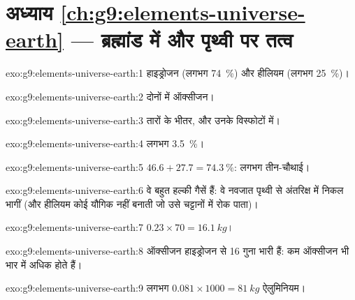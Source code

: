 \section*{अध्याय \ref{ch:g9:elements-universe-earth} --- ब्रह्मांड में और पृथ्वी पर तत्व}

\begin{solution}{exo:g9:elements-universe-earth:1}
हाइड्रोजन (लगभग \qty{74}{\percent}) और हीलियम (लगभग
\qty{25}{\percent})।
\end{solution}

\begin{solution}{exo:g9:elements-universe-earth:2}
दोनों में ऑक्सीजन।
\end{solution}

\begin{solution}{exo:g9:elements-universe-earth:3}
तारों के भीतर, और उनके विस्फोटों में।
\end{solution}

\begin{solution}{exo:g9:elements-universe-earth:4}
लगभग \qty{3.5}{\percent}।
\end{solution}

\begin{solution}{exo:g9:elements-universe-earth:5}
$46.6 + 27.7 = \qty{74.3}{\percent}$: लगभग तीन-चौथाई।
\end{solution}

\begin{solution}{exo:g9:elements-universe-earth:6}
वे बहुत हल्की गैसें हैं: वे नवजात पृथ्वी से अंतरिक्ष में निकल भागीं
(और हीलियम कोई यौगिक नहीं बनाती जो उसे चट्टानों में रोक पाता)।
\end{solution}

\begin{solution}{exo:g9:elements-universe-earth:7}
$0.23 \times 70 = \qty{16.1}{kg}$।
\end{solution}

\begin{solution}{exo:g9:elements-universe-earth:8}
ऑक्सीजन  हाइड्रोजन  से 16 गुना भारी हैं: कम ऑक्सीजन  भी
भार में अधिक होते हैं।
\end{solution}

\begin{solution}{exo:g9:elements-universe-earth:9}
लगभग $0.081 \times 1000 = \qty{81}{kg}$ ऐलुमिनियम।
\end{solution}

